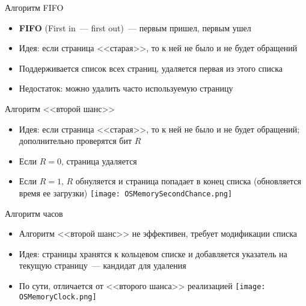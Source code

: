 \documentclass[aspectratio=169,14pt]{beamer}
\begin{document}
\begin{frame}{Алгоритм FIFO}
    \begin{itemize}
        \item \textbf{FIFO} (First in~--- first out)~--- первым пришел, первым ушел
        \item Идея: если страница <<старая>>, то к ней не было и не будет
        обращений
        \item Поддерживается список всех страниц, удаляется первая из этого
        списка
        \item Недостаток: можно удалить часто используемую страницу
    \end{itemize}
\end{frame}

\begin{frame}{Алгоритм <<второй шанс>>}
    \begin{itemize}
        \item Идея: если страница <<старая>>, то к ней не было и не будет
        обращений; дополнительно проверятся бит $R$
        \item Если $R = 0$, страница удаляется
        \item Если $R = 1$, $R$ обнуляется и страница попадает в конец
        списка (обновляется время ее загрузки)
        \texttt{[image: OSMemorySecondChance.png]}
    \end{itemize}
\end{frame}

\begin{frame}{Алгоритм часов}
    \begin{itemize}
        \item Алгоритм <<второй шанс>> не эффективен, требует модификации
        списка
        \item Идея: страницы хранятся к кольцевом списке и добавляется
        указатель на текущую страницу~--- кандидат для удаления
        \item По сути, отличается от <<второго шанса>> реализацией
        \texttt{[image: OSMemoryClock.png]}
    \end{itemize}
\end{frame}
\end{document}
